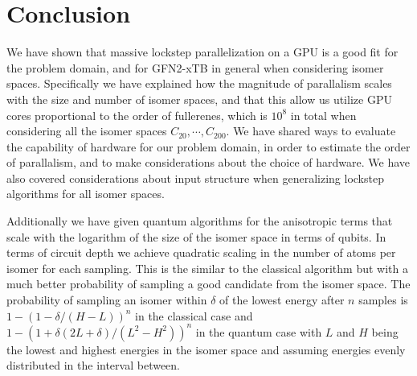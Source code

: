 \chapter{Conclusion}\label{sec:conclusion}

We have shown that massive lockstep parallelization on a GPU is a good fit for the problem domain, and for GFN2-xTB in general when considering isomer spaces. Specifically we have explained how the magnitude of parallalism scales with the size and number of isomer spaces, and that this allow us utilize GPU cores proportional to the order of fullerenes, which is $10^8$ in total when considering all the isomer spaces \(C_{20}, \cdots, C_{200} \). We have shared ways to evaluate the capability of hardware for our problem domain, in order to estimate the order of parallalism, and to make considerations about the choice of hardware. We have also covered considerations about input structure when generalizing lockstep algorithms for all isomer spaces.

Additionally we have given quantum algorithms for the anisotropic terms that scale with the logarithm of the size of the isomer space in terms of qubits. In terms of circuit depth we achieve quadratic scaling in the number of atoms per isomer for each sampling. This is the similar to the classical algorithm but with a much better probability of sampling a good candidate from the isomer space. The probability of sampling an isomer within $\delta$ of the lowest energy after $n$ samples is $1-(1-\delta/(H-L))^n$ in the classical case and $1-(1+\delta(2L + \delta)/(L^2-H^2))^n$ in the quantum case with $L$ and $H$ being the lowest and highest energies in the isomer space and assuming energies evenly distributed in the interval between.
